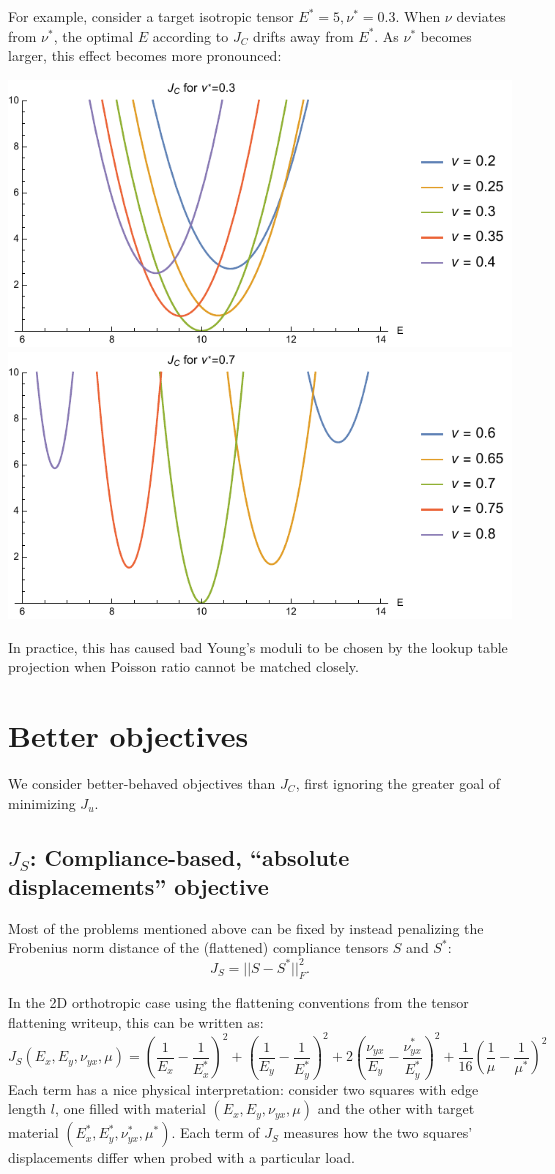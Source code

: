 \documentclass[10pt]{article}
\begin{document}
For example, consider a target isotropic tensor $E^* = 5, \nu^* = 0.3$. When
$\nu$ deviates from $\nu^*$, the optimal $E$ according to $J_C$ drifts away from
$E^*$. As $\nu^*$ becomes larger, this effect becomes more pronounced:
\\
\begin{minipage}{\linewidth}
    \centering
    \includegraphics[width=.45\textwidth]{interplayE.pdf}
    \includegraphics[width=.45\textwidth]{interplayELargeNu.pdf}
\end{minipage}
In practice, this has caused bad Young's moduli to be chosen by the lookup
table projection when Poisson ratio cannot be matched closely.

\section{Better objectives}
We consider better-behaved objectives than $J_C$, first ignoring the greater goal of minimizing $J_u$.

\subsection{$J_S$: Compliance-based, ``absolute displacements'' objective}
Most of the problems mentioned above can be fixed by instead penalizing the
Frobenius norm distance of the (flattened) compliance tensors $S$ and $S^*$:
$$
    J_S = ||S - S^*||^2_F.
$$

In the 2D orthotropic case using the flattening conventions from the tensor
flattening writeup, this can be written as:
\begin{equation}
    \label{eqn:JS}
J_S(E_x, E_y, \nu_{yx}, \mu) = 
\left(\frac{1}{E_x} - \frac{1}{E_x^*}\right)^2 +
\left(\frac{1}{E_y} - \frac{1}{E_y^*}\right)^2 +
2 \left(\frac{\nu_{yx}}{E_y} - \frac{\nu_{yx}^*}{E_y^*}\right)^2 +
\frac{1}{16} \left(\frac{1}{\mu} - \frac{1}{\mu^*}\right)^2
\end{equation}
Each term has a nice physical interpretation: consider two squares with edge
length $l$, one filled with material $(E_x, E_y, \nu_{yx}, \mu)$ and the other
with target material $(E_x^*, E_y^*, \nu_{yx}^*, \mu^*)$. Each term of $J_S$
measures how the two squares' displacements differ when probed with a particular
load.
\end{document}
